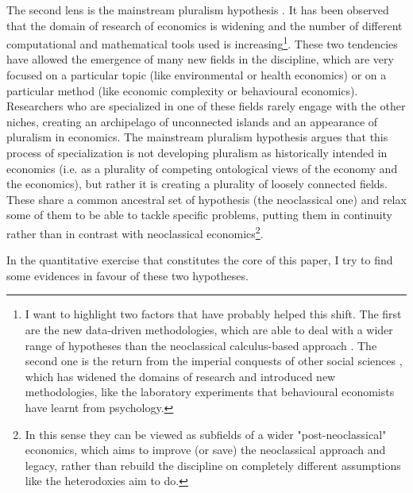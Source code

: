 \documentclass[a4paper, 11pt, headings=standardclasses, tablecaptionsbelow]{scrartcl}
\begin{document}
The second lens is the mainstream pluralism hypothesis \parencite{davis2006,davis2019a,davis2019b,cedrini2018}. It has been observed that the domain of research of economics is widening and the number of different computational and mathematical tools used is increasing\footnote{I want to highlight two factors that have probably helped this shift. The first are the new data-driven methodologies, which are able to deal with a wider range of hypotheses than the neoclassical calculus-based approach \parencite{cherrier2022}. The second one is the return from the imperial conquests of other social sciences \parencite{fourcade2015,marchionatti2017}, which has widened the domains of research and introduced new methodologies, like the laboratory experiments that behavioural economists have learnt from psychology.}. These two tendencies have allowed the emergence of many new fields in the discipline, which are very focused on a particular topic (like environmental or health economics) or on a particular method (like economic complexity or behavioural economics).
Researchers who are specialized in one of these fields rarely engage with the other niches, creating an archipelago of unconnected islands and an appearance of pluralism in economics.
The mainstream pluralism hypothesis argues that this process of specialization is not developing pluralism as historically intended in economics (i.e. as a plurality of competing ontological views of the economy and the economics), but rather it is creating a plurality of loosely connected fields. These share a common ancestral set of hypothesis (the neoclassical one) and relax some of them to be able to tackle specific problems, putting them in continuity rather than in contrast with neoclassical economics\footnote{In this sense they can be viewed as subfields of a wider "post-neoclassical" economics, which aims to improve (or save) the neoclassical approach and legacy, rather than rebuild the discipline on completely different assumptions like the heterodoxies aim to do.}.

In the quantitative exercise that constitutes the core of this paper, I try to find some evidences in favour of these two hypotheses.
\end{document}
